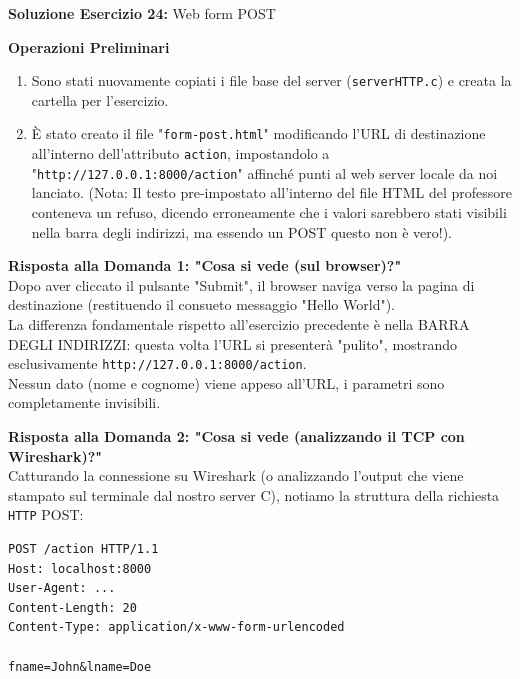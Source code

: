 \documentclass[11pt]{article}
\begin{document}
\begin{tcolorbox}[colback=green!5!white,colframe=green!75!black,title=\textbf{RISPOSTA}, breakable]
\textbf{Soluzione Esercizio 24:} Web form POST

\textbf{Operazioni Preliminari}
\begin{enumerate}
    \item Sono stati nuovamente copiati i file base del server (\texttt{serverHTTP.c}) e creata la cartella per l'esercizio.
    \item È stato creato il file "\texttt{form-post.html}" modificando l'URL di destinazione all'interno dell'attributo \texttt{action}, impostandolo a "\texttt{http://127.0.0.1:8000/action}" affinché punti al web server locale da noi lanciato. (Nota: Il testo pre-impostato all'interno del file HTML del professore conteneva un refuso, dicendo erroneamente che i valori sarebbero stati visibili nella barra degli indirizzi, ma essendo un POST questo non è vero!).
\end{enumerate}

\textbf{Risposta alla Domanda 1: "Cosa si vede (sul browser)?"}\\
Dopo aver cliccato il pulsante "Submit", il browser naviga verso la pagina di destinazione (restituendo il consueto messaggio "Hello World").\\
La differenza fondamentale rispetto all'esercizio precedente è nella BARRA DEGLI INDIRIZZI: questa volta l'URL si presenterà "pulito", mostrando esclusivamente \texttt{http://127.0.0.1:8000/action}.\\
Nessun dato (nome e cognome) viene appeso all'URL, i parametri sono completamente invisibili.

\textbf{Risposta alla Domanda 2: "Cosa si vede (analizzando il TCP con Wireshark)?"}\\
Catturando la connessione su Wireshark (o analizzando l'output che viene stampato sul terminale dal nostro server C), notiamo la struttura della richiesta \texttt{HTTP} POST:

\begin{lstlisting}[basicstyle=\ttfamily\small]
POST /action HTTP/1.1
Host: localhost:8000
User-Agent: ...
Content-Length: 20
Content-Type: application/x-www-form-urlencoded

fname=John&lname=Doe
\end{lstlisting}


\end{tcolorbox}
\end{document}
